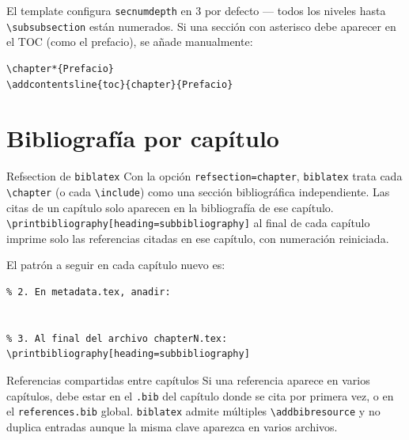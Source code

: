 El template configura \texttt{secnumdepth} en 3 por defecto --- todos los
niveles hasta \texttt{\textbackslash subsubsection} están numerados. Si una
sección con asterisco debe aparecer en el TOC (como el prefacio), se añade
manualmente:

\begin{lstlisting}[style=latex, frame=none, numbers=none]
\chapter*{Prefacio}
\addcontentsline{toc}{chapter}{Prefacio}
\end{lstlisting}

\section{Bibliografía por capítulo}
\label{sec:bibliografia}

\begin{definicion}{Refsection de \texttt{biblatex}}
Con la opción \texttt{refsection=chapter}, \texttt{biblatex} trata cada
\texttt{\textbackslash chapter} (o cada \texttt{\textbackslash include})
como una sección bibliográfica independiente. Las citas de un capítulo
solo aparecen en la bibliografía de ese capítulo.
\texttt{\textbackslash printbibliography[heading=subbibliography]} al
final de cada capítulo imprime solo las referencias citadas en ese capítulo,
con numeración reiniciada.
\end{definicion}

El patrón a seguir en cada capítulo nuevo es:

\begin{lstlisting}[style=latex, frame=none, numbers=none]
% 1. Crear references/chapterN.bib con las referencias del capitulo
% 2. En metadata.tex, anadir:


% 3. Al final del archivo chapterN.tex:
\printbibliography[heading=subbibliography]
\end{lstlisting}

\begin{observacion}{Referencias compartidas entre capítulos}
Si una referencia aparece en varios capítulos, debe estar en el
\texttt{.bib} del capítulo donde se cita por primera vez, o en el
\texttt{references.bib} global. \texttt{biblatex} admite múltiples
\texttt{\textbackslash addbibresource} y no duplica entradas aunque
la misma clave aparezca en varios archivos.
\end{observacion}

